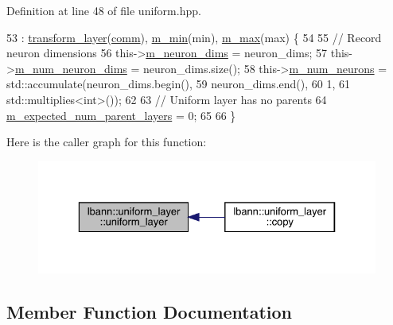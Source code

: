 Definition at line 48 of file uniform.\+hpp.


\begin{DoxyCode}
53     : \hyperlink{classlbann_1_1transform__layer_a4b72501e0f4d0745c8b13c5331055e65}{transform\_layer}(\hyperlink{file__io_8cpp_ab048c6f9fcbcfaa57ce68b00263dbebe}{comm}), \hyperlink{classlbann_1_1uniform__layer_ad2da58c380cf2803da709dd936c19aa1}{m\_min}(min), \hyperlink{classlbann_1_1uniform__layer_a45004689408c17baf76399f64489c8d4}{m\_max}(max) \{
54 
55     \textcolor{comment}{// Record neuron dimensions}
56     this->\hyperlink{classlbann_1_1Layer_abb34bb8031f57a483e2e327a5f229f48}{m\_neuron\_dims} = neuron\_dims;
57     this->\hyperlink{classlbann_1_1Layer_adfd6178d21498c9095cd947ae1eb2d6a}{m\_num\_neuron\_dims} = neuron\_dims.size();
58     this->\hyperlink{classlbann_1_1Layer_a6b5ebc8a7d9329d8a773ed787e7b41d8}{m\_num\_neurons} = std::accumulate(neuron\_dims.begin(),
59                                           neuron\_dims.end(),
60                                           1,
61                                           std::multiplies<int>());
62 
63     \textcolor{comment}{// Uniform layer has no parents}
64     \hyperlink{classlbann_1_1Layer_a841b96b25555247f52921c7f13ae1dfa}{m\_expected\_num\_parent\_layers} = 0;
65 
66   \}
\end{DoxyCode}
Here is the caller graph for this function\+:\nopagebreak
\begin{figure}[H]
\begin{center}
\leavevmode
\includegraphics[width=329pt]{classlbann_1_1uniform__layer_a9ed147e3edd3d4556d0130a77a790f08_icgraph}
\end{center}
\end{figure}


\subsection{Member Function Documentation}
\mbox{\label{classlbann_1_1uniform__layer_a40cec806825a1cb07f66867d0350dd1c}} 
